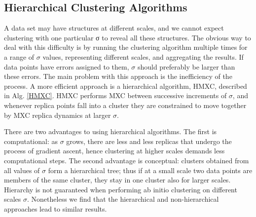 \documentclass[preprint,12pt]{elsarticle}
\begin{document}
\subsection{Hierarchical Clustering Algorithms}
\label{hierarchical}
A data set may have structures at different scales, and we cannot expect clustering with one particular σ to reveal all these structures. The obvious way to deal with this difficulty is by running the clustering algorithm multiple times for a range of $\sigma$ values, representing different scales, and aggregating the results. If data points have errors assigned to them, $\sigma$ should preferably be larger than these errors.
The main problem with this approach is the inefficiency of the process. A more efficient approach is a hierarchical algorithm, HMXC, described in Alg. \ref{HMXC}. HMXC performs MXC between successive increments of $\sigma$, and whenever replica points fall into a cluster they are constrained to move together by MXC replica dynamics at larger $\sigma$.

There are two advantages to using hierarchical algorithms. The first is computational: as $\sigma$ grows, there are less and less replicas that undergo the process of gradient ascent, hence clustering at higher scales demands less computational steps.
The second advantage is conceptual: clusters obtained from all values of $\sigma$ form a hierarchical tree; thus if at a small scale two data points are members of the same cluster, they stay in one cluster also for larger scales. Hierarchy is not guaranteed when performing ab initio clustering on different scales $\sigma$. Nonetheless we find that the hierarchical and non-hierarchical approaches lead to similar results.
\end{document}
